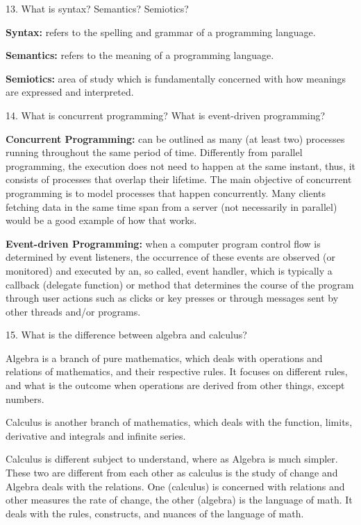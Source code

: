 \documentclass{article}
\begin{document}
13. What is syntax? Semantics? Semiotics?
\newline

\textbf{Syntax:} refers to the spelling and grammar of a programming language.

\textbf{Semantics:} refers to the meaning of a programming language.

\textbf{Semiotics:} area of study which is fundamentally concerned with how meanings are expressed and interpreted.
\newline

14. What is concurrent programming? What is event-driven programming?
\newline

\textbf{Concurrent Programming:} can be outlined as many (at least two) processes running throughout the same period of time. Differently from parallel programming, the execution does not need to happen at the same instant, thus, it consists of processes that overlap their lifetime. The main objective of concurrent programming is to model processes that happen concurrently. Many clients fetching data in the same time span from a server (not necessarily in parallel) would be a good example of how that works.

\textbf{Event-driven Programming:} when a computer program control flow is determined by event listeners, the occurrence of these events are observed (or monitored) and executed by an, so called, event handler, which is typically a callback (delegate function) or method that determines the course of the program through user actions such as clicks or key presses or through messages sent by other threads and/or programs.
\newline

\newpage

15. What is the difference between algebra and calculus?
\newline

Algebra is a branch of pure mathematics, which deals with operations and relations of mathematics, and their respective rules. It focuses on different rules, and what is the outcome when operations are derived from other things, except numbers.

Calculus is another branch of mathematics, which deals with the function, limits, derivative and integrals and infinite series.

Calculus is different subject to understand, where as Algebra is much simpler. These two are different from each other as calculus is the study of change and Algebra deals with the relations. One (calculus) is concerned with relations and other measures the rate of change, the other (algebra) is the language of math. It deals with the rules, constructs, and nuances of the language of math.
\newline
\end{document}
